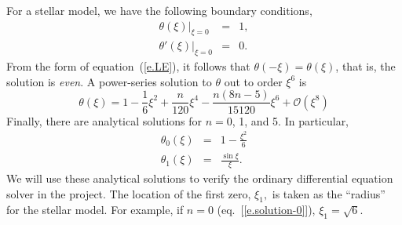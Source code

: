 For a stellar model, we have the following boundary conditions,
\begin{eqnarray}
\label{e.thetabc}\left.\theta(\xi)\right|_{\xi = 0} &=& 1,\\
\label{e.thetapbc}\left.\theta'(\xi)\right|_{\xi=0} &=& 0.
\end{eqnarray}
From the form of equation~(\ref{e.LE}), it follows that $\theta(-\xi) = \theta(\xi)$, that is, the solution is \emph{even}. A power-series solution to $\theta$ out to order $\xi^{6}$ is
\begin{equation}\label{e.series}
\theta(\xi) = 1 - \frac{1}{6}\xi^{2} + \frac{n}{120}\xi^{4} - \frac{n(8n-5)}{15120}\xi^{6} + \mathcal{O}(\xi^{8})
\end{equation}
Finally, there are analytical solutions for $n = 0$, 1, and 5.  In particular,
\begin{eqnarray}
\theta_{0}(\xi) &=& 1-\frac{\xi^{2}}{6}\label{e.solution-0}\\
\theta_{1}(\xi) &=& \frac{\sin\xi}{\xi}.\label{e.solution-1}
\end{eqnarray}
We will use these analytical solutions to verify the ordinary differential equation solver in the project.  The location of the first zero, $\xi_{1},$ is taken as the ``radius'' for the stellar model.  For example, if $n = 0$ (eq.~[\ref{e.solution-0}]), $\xi_{1} = \sqrt{6}$.
